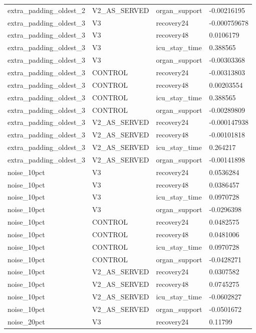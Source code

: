 \begin{tabular}{llll}
extra\_padding\_oldest\_2 & V2\_AS\_SERVED & organ\_support & -0.00216195 \\
extra\_padding\_oldest\_3 & V3 & recovery24 & -0.000759678 \\
extra\_padding\_oldest\_3 & V3 & recovery48 & 0.0106179 \\
extra\_padding\_oldest\_3 & V3 & icu\_stay\_time & 0.388565 \\
extra\_padding\_oldest\_3 & V3 & organ\_support & -0.00303368 \\
extra\_padding\_oldest\_3 & CONTROL & recovery24 & -0.00313803 \\
extra\_padding\_oldest\_3 & CONTROL & recovery48 & 0.00203554 \\
extra\_padding\_oldest\_3 & CONTROL & icu\_stay\_time & 0.388565 \\
extra\_padding\_oldest\_3 & CONTROL & organ\_support & -0.00289809 \\
extra\_padding\_oldest\_3 & V2\_AS\_SERVED & recovery24 & -0.000147938 \\
extra\_padding\_oldest\_3 & V2\_AS\_SERVED & recovery48 & -0.00101818 \\
extra\_padding\_oldest\_3 & V2\_AS\_SERVED & icu\_stay\_time & 0.264217 \\
extra\_padding\_oldest\_3 & V2\_AS\_SERVED & organ\_support & -0.00141898 \\
noise\_10pct & V3 & recovery24 & 0.0536284 \\
noise\_10pct & V3 & recovery48 & 0.0386457 \\
noise\_10pct & V3 & icu\_stay\_time & 0.0970728 \\
noise\_10pct & V3 & organ\_support & -0.0296398 \\
noise\_10pct & CONTROL & recovery24 & 0.0482575 \\
noise\_10pct & CONTROL & recovery48 & 0.0481006 \\
noise\_10pct & CONTROL & icu\_stay\_time & 0.0970728 \\
noise\_10pct & CONTROL & organ\_support & -0.0428271 \\
noise\_10pct & V2\_AS\_SERVED & recovery24 & 0.0307582 \\
noise\_10pct & V2\_AS\_SERVED & recovery48 & 0.0745275 \\
noise\_10pct & V2\_AS\_SERVED & icu\_stay\_time & -0.0602827 \\
noise\_10pct & V2\_AS\_SERVED & organ\_support & -0.0501672 \\
noise\_20pct & V3 & recovery24 & 0.11799 \\

\end{tabular}
